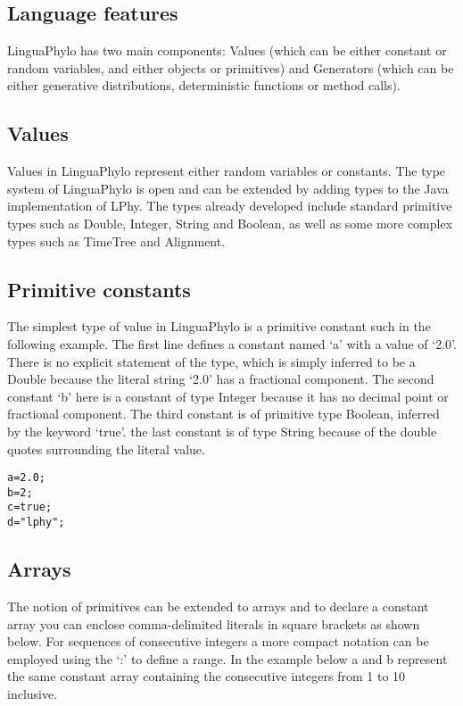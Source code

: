 \documentclass[10pt,letterpaper,table]{article}
\begin{document}
\subsection*{Language features}

LinguaPhylo has two main components: Values (which can be either constant or random variables, and either objects or primitives) and Generators (which can be either generative distributions, deterministic functions or method calls).

\subsection*{Values}

Values in LinguaPhylo represent either random variables or constants. The type system of LinguaPhylo is open and can be extended by adding types to the Java implementation of LPhy. The types already developed include standard primitive types such as Double, Integer, String and Boolean, as well as some more complex types such as TimeTree and Alignment.

\subsection*{Primitive constants}

The simplest type of value in LinguaPhylo is a primitive constant such in the following example. The first line defines a constant named `a' with a value of `2.0'. There is no explicit statement of the type, which is simply inferred to be a Double because the literal string `2.0' has a fractional component. The second constant `b' here is a constant of type Integer because it has no decimal point or fractional component. The third constant is of primitive type Boolean, inferred by the keyword `true'. the last constant is of type String because of the double quotes surrounding the literal value.

{\singlespacing
\begin{alltt}
  a = 2.0;
  b = 2;
  c = true;
  d = "lphy";
\end{alltt}
}

\subsection*{Arrays}

The notion of primitives can be extended to arrays and to declare a constant array you can enclose comma-delimited literals in square brackets as shown below. For sequences of consecutive integers a more compact notation can be employed using the `:' to define a range. In the example below a and b represent the same constant array containing the consecutive integers from 1 to 10 inclusive.
\end{document}
